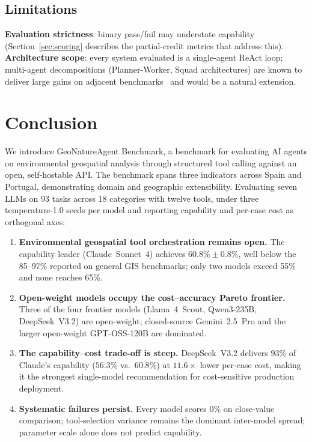 \documentclass[10pt,twocolumn]{article}
\begin{document}
\subsection{Limitations}

\textbf{Evaluation strictness}: binary pass/fail may understate capability (Section~\ref{sec:scoring} describes the partial-credit metrics that address this). \textbf{Architecture scope}: every system evaluated is a single-agent ReAct loop; multi-agent decompositions (Planner-Worker, Squad architectures) are known to deliver large gains on adjacent benchmarks~\citep{luo2025geojsonagents, lee2025geollmsquad} and would be a natural extension.


\section{Conclusion}
\label{sec:conclusion}

We introduce GeoNatureAgent Benchmark, a benchmark for evaluating AI agents on environmental geospatial analysis through structured tool calling against an open, self-hostable API. The benchmark spans three indicators across Spain and Portugal, demonstrating domain and geographic extensibility. Evaluating seven LLMs on 93 tasks across 18 categories with twelve tools, under three temperature-1.0 seeds per model and reporting capability and per-case cost as orthogonal axes:

\begin{enumerate}
\item \textbf{Environmental geospatial tool orchestration remains open.} The capability leader (Claude~Sonnet~4) achieves $60.8\%\pm0.8\%$, well below the 85--97\% reported on general GIS benchmarks; only two models exceed 55\% and none reaches 65\%.
\item \textbf{Open-weight models occupy the cost--accuracy Pareto frontier.} Three of the four frontier models (Llama~4~Scout, Qwen3-235B, DeepSeek~V3.2) are open-weight; closed-source Gemini~2.5~Pro and the larger open-weight GPT-OSS-120B are dominated.
\item \textbf{The capability--cost trade-off is steep.} DeepSeek~V3.2 delivers $93\%$ of Claude's capability ($56.3\%$ vs.\ $60.8\%$) at $11.6\times$ lower per-case cost, making it the strongest single-model recommendation for cost-sensitive production deployment.
\item \textbf{Systematic failures persist.} Every model scores 0\% on close-value comparison; tool-selection variance remains the dominant inter-model spread; parameter scale alone does not predict capability.
\end{enumerate}
\end{document}
